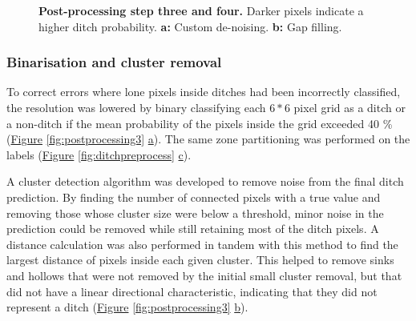 \documentclass[11pt, review]{elsarticle} %
\begin{document}
\begin{figure} [!htb]
{        }
    \caption{\textbf{Post-processing step three and four.} Darker pixels indicate a higher ditch probability. \textbf{a: }Custom de-noising. \textbf{b: }Gap filling.}
    \label{fig:postprocessing2}
\end{figure}

\subsubsection{Binarisation and cluster removal}

To correct errors where lone pixels inside ditches had been incorrectly classified, the resolution was lowered by binary classifying each $6*6$ pixel grid as a ditch or a non-ditch if the mean probability of the pixels inside the grid exceeded 40 \% (\hyperref[fig:postprocessing3]{Figure} \ref{fig:postprocessing3} \hyperref[fig:postprocessing3]{a}). The same zone partitioning was performed on the labels (\hyperref[fig:ditchpreprocess]{Figure} \ref{fig:ditchpreprocess} \hyperref[fig:ditchpreprocess]{c}).

A cluster detection algorithm was developed to remove noise from the final ditch prediction. By finding the number of connected pixels with a true value and removing those whose cluster size were below a threshold, minor noise in the prediction could be removed while still retaining most of the ditch pixels. A distance calculation was also performed in tandem with this method to find the largest distance of pixels inside each given cluster. This helped to remove sinks and hollows that were not removed by the initial small cluster removal, but that did not have a linear directional characteristic, indicating that they did not represent a ditch (\hyperref[fig:postprocessing3]{Figure} \ref{fig:postprocessing3} \hyperref[fig:postprocessing3]{b}).
\end{document}
